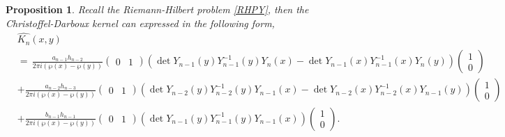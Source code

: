 \documentclass[11pt,a4paper]{article}
\newtheorem{proposition}[theorem]{Proposition}
\theoremstyle{definition}
\numberwithin{equation}{section}
\numberwithin{theorem}{section}
\begin{document}
\begin{proposition}\label{prop:CD-RHP}
    Recall the Riemann-Hilbert problem \ref{RHPY}, then the Christoffel-Darboux kernel can expressed in the following form,
\begin{equation}\label{RHPCD}
\begin{aligned}
&\widehat{K_n}(x, y) \\
&= \, \frac{a_{n-1} h_{n-2}}{2\pi i (\wp(x) - \wp(y))} \begin{pmatrix} 0 & 1 \end{pmatrix} \left( \det Y_{n-1}(y) Y_{n-1}^{-1}(y) Y_n(x) - \det Y_{n-1}(x) Y_{n-1}^{-1}(x) Y_n(y) \right) \begin{pmatrix} 1 \\ 0 \end{pmatrix} \\
& + \frac{a_{n-2} h_{n-3}}{2\pi i (\wp(x) - \wp(y))} \begin{pmatrix} 0 & 1 \end{pmatrix} \left( \det Y_{n-2}(y) Y_{n-2}^{-1}(y) Y_{n-1}(x) - \det Y_{n-2}(x) Y_{n-2}^{-1}(x) Y_{n-1}(y) \right) \begin{pmatrix} 1 \\ 0 \end{pmatrix} \\
& + \frac{b_{n-1} h_{n-1}}{2\pi i (\wp(x) - \wp(y))} \begin{pmatrix} 0 & 1 \end{pmatrix} \left( \det Y_{n-1}(y) Y_{n-1}^{-1}(y) Y_{n-1}(x) \right) \begin{pmatrix} 1 \\ 0 \end{pmatrix}.
\end{aligned}
\end{equation}
\end{proposition}
\end{document}

